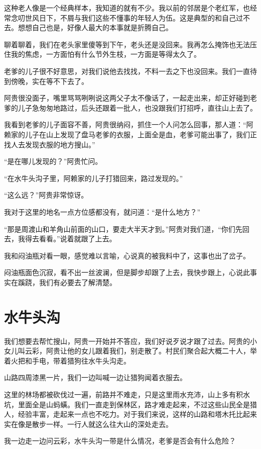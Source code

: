这种老人像是一个经典样本，我知道的就有不少。我以前的邻居是个老红军，也经常念叨世风日下，不屑与我们这些不懂事的年轻人为伍。这是典型的和自己过不去。想想自己也是，好像人最大的本事就是折腾自己。

聊着聊着，我们在老头家里傻等到下午，老头还是没回来。我再怎么掩饰也无法压住我的焦虑，一方面怕有什么节外生枝，一方面是等得太久了。

老爹的儿子很不好意思，对我们说他去找找，不料一去之下也没回来。我们一直待到傍晚，实在等不下去了。

阿贵很没面子，嘴里骂骂咧咧说这两父子太不像话了，一起走出来，却正好碰到老爹的儿子急匆匆地路过，后头还跟着一批人，也没跟我们打招呼，直往山上去了。

我看到老爹的儿子面容不善，阿贵很纳闷，抓住一个人问怎么回事，那人道：“阿赖家的儿子在山上发现了盘马老爹的衣服，上面全是血，老爹可能出事了，我们正找人去发现衣服的地方搜山。”

“是在哪儿发现的？”阿贵忙问。

“在水牛头沟子里，阿赖家的儿子打猎回来，路过发现的。”

“这么远？”阿贵非常惊讶。

我对于这里的地名一点方位感都没有，就问道：“是什么地方？”

“那是周渡山和羊角山前面的山口，要走大半天才到。”阿贵对我们道，“你们先回去，我得去看看。”说着就跟了上去。

我和闷油瓶对看一眼，感觉难以言喻，心说真的被我料中了，这事也出了岔子。

闷油瓶面色沉寂，看不出一丝波澜，但是脚步却跟了上去，我快步跟上，心说此事实在蹊跷，我们有必要去了解清楚。

\chapter{水牛头沟}

我们想要去帮忙搜山，阿贵一开始并不答应，我们好说歹说才跟了过去。阿贵的小女儿叫云彩，阿贵让他的女儿跟着我们，别走散了。村民们聚合起大概二十人，举着火把和手电，带着猎狗往水牛头沟走。

山路四周漆黑一片，我们一边叫喊一边让猎狗闻着衣服去。

这里的林场都被砍伐过一遍，前路并不难走，只是这里雨水充沛，山上多有积水坑，里面全是山蚂蟥。我们一直走到保林区，路才难走起来，不过这些山民全是猎人，经验丰富，走起来一点也不吃力。对于我们来说，这样的山路和塔木托比起来实在像是散步一样。一行人就这么往大山的深处走去。

我一边走一边问云彩，水牛头沟一带是什么情况，老爹是否会有什么危险？


